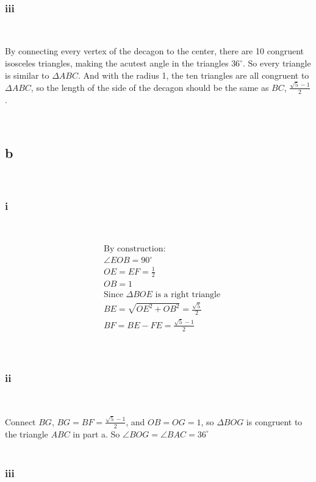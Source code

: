 \documentclass{article}
\begin{document}
~

\subsubsection*{iii}

~

By connecting every vertex of the decagon to the center, there are 10 congruent isosceles triangles, making the acutest angle in the triangles $36^\circ$. So every triangle is similar to $\Delta ABC$. And with the radius 1, the ten triangles are all congruent to $\Delta ABC$, so the length of the side of the decagon should be the same as $BC$, $\frac{\sqrt{5}-1}{2}$.

~

\subsection*{b}

~

\subsubsection*{i}

~

\begin{align*}
    &\text{By construction}:\\
    &\angle EOB=90^\circ\\
    &OE=EF=\frac{1}{2}\\
    &OB=1\\
    &\text{Since }\Delta BOE\text{ is a right triangle}\\
    &BE=\sqrt{OE^2+OB^2}=\frac{\sqrt{5}}{2}\\
    &BF=BE-FE=\frac{\sqrt{5}-1}{2}\\
\end{align*}

~

\subsubsection*{ii}

~

Connect $BG$, $BG=BF=\frac{\sqrt{5}-1}{2}$, and $OB=OG=1$, so $\Delta BOG$ is congruent to the triangle $ABC$ in part a. So $\angle BOG=\angle BAC=36^\circ$\\

~

\subsubsection*{iii}
\end{document}
